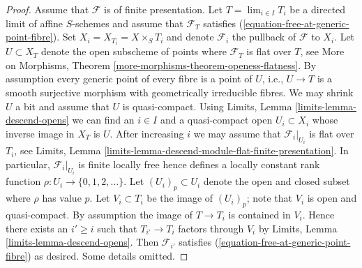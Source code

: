 \begin{proof}
\medskip\noindent
Assume that $\mathcal{F}$ is of finite presentation.
Let $T = \lim_{i \in I} T_i$ be a directed limit of affine $S$-schemes
and assume that $\mathcal{F}_T$ satisfies
(\ref{equation-free-at-generic-point-fibre}).
Set $X_i = X_{T_i} = X \times_S T_i$ and denote $\mathcal{F}_i$ the
pullback of $\mathcal{F}$ to $X_i$.
Let $U \subset X_T$ denote the open subscheme of points where
$\mathcal{F}_T$ is flat over $T$, see
More on Morphisms, Theorem \ref{more-morphisms-theorem-openess-flatness}.
By assumption every generic point of every fibre is a point of $U$, i.e.,
$U \to T$ is a smooth surjective morphism with geometrically irreducible
fibres. We may shrink $U$ a bit and assume that $U$ is quasi-compact.
Using
Limits, Lemma \ref{limits-lemma-descend-opens}
we can find an $i \in I$ and a quasi-compact open $U_i \subset X_i$
whose inverse image in $X_T$ is $U$. After increasing $i$ we may
assume that $\mathcal{F}_i|_{U_i}$ is flat over $T_i$, see
Limits, Lemma \ref{limits-lemma-descend-module-flat-finite-presentation}.
In particular, $\mathcal{F}_i|_{U_i}$ is finite locally free
hence defines a locally constant
rank function $\rho : U_i \to \{0, 1, 2, \ldots \}$.
Let $(U_i)_p \subset U_i$ denote the open and closed
subset where $\rho$ has value $p$. Let $V_i \subset T_i$ be the
image of $(U_i)_p$; note that $V_i$ is open and quasi-compact.
By assumption the image of $T \to T_i$ is contained in $V_i$.
Hence there exists an $i' \geq i$ such that $T_{i'} \to T_i$ factors
through $V_i$ by
Limits, Lemma \ref{limits-lemma-descend-opens}.
Then $\mathcal{F}_{i'}$ satisfies (\ref{equation-free-at-generic-point-fibre})
as desired. Some details omitted.
\end{proof}

